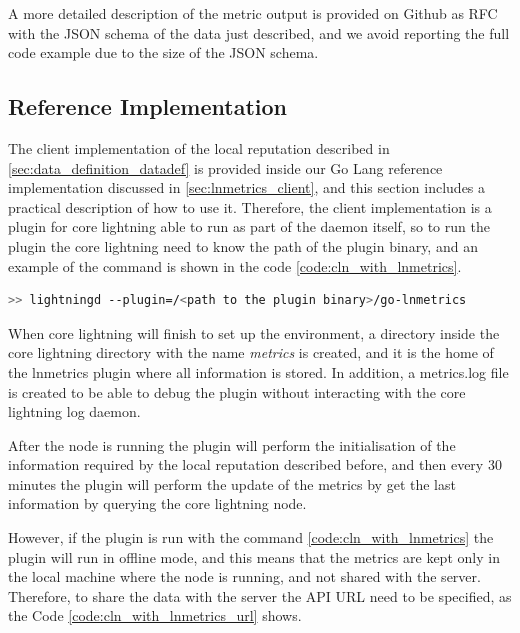 A more detailed description of the metric output is provided on Github as RFC with the JSON schema 
of the data just described, and we avoid reporting the full code example due to the size of the 
JSON schema. 

\subsection{Reference Implementation}

The client implementation of the local reputation described in \ref{sec:data_definition_datadef} 
is provided inside our Go Lang reference implementation discussed in \ref{sec:lnmetrics_client},
and this section includes a practical description of how to use it.
Therefore, the client implementation is a plugin for core lightning able to 
run as part of the daemon itself, so to run the plugin the core lightning
need to know the path of the plugin binary, and an example of the command is shown in
the code \ref{code:cln_with_lnmetrics}.

\begin{lstlisting}[language=bash, basicstyle=\small,
                  caption={Command to run the core lightning daemon with the lnmetrics plugin enabled.}, 
                  label={code:cln_with_lnmetrics}]
>> lightningd --plugin=/<path to the plugin binary>/go-lnmetrics
\end{lstlisting}

When core lightning will finish to set up the environment, a directory inside 
the core lightning directory with the name \emph{metrics} is created, and 
it is the home of the lnmetrics plugin where all information is stored. 
In addition, a metrics.log file is created to be able to debug the 
plugin without interacting with the core lightning log daemon.

After the node is running the plugin will perform the initialisation 
of the information required by the local reputation described before, and 
then every 30 minutes the plugin will perform the update of the metrics by 
get the last information by querying the core lightning node. 

However, if the plugin is run with the command \ref{code:cln_with_lnmetrics}
the plugin will run in offline mode, and this means that the metrics are kept 
only in the local machine where the node is running, and not shared with the server. 
Therefore, to share the data with the server the API URL need to be specified,
as the Code \ref{code:cln_with_lnmetrics_url} shows.

